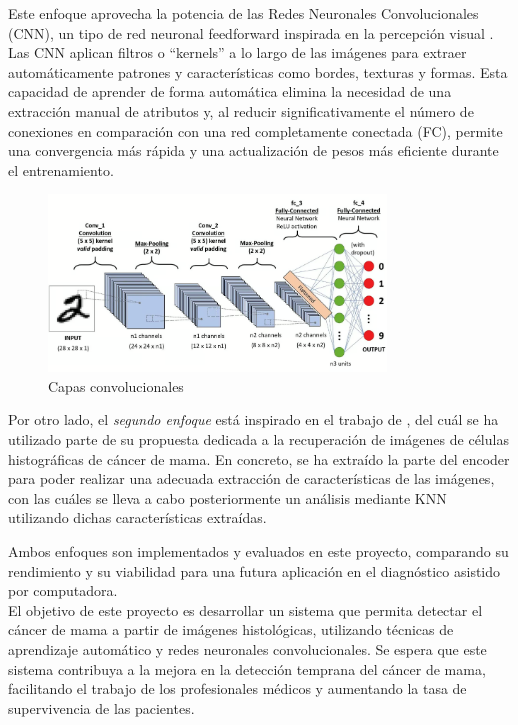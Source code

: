 \documentclass[12pt]{article} %
\begin{document}
Este enfoque aprovecha la potencia de las Redes Neuronales Convolucionales (CNN), un tipo de red neuronal feedforward inspirada en la percepción visual \cite{hubel1962receptive}. Las CNN aplican filtros o “kernels” a lo largo de las imágenes para extraer automáticamente patrones y características como bordes, texturas y formas. Esta capacidad de aprender de forma automática elimina la necesidad de una extracción manual de atributos y, al reducir significativamente el número de conexiones en comparación con una red completamente conectada (FC), permite una convergencia más rápida y una actualización de pesos más eficiente durante el entrenamiento.\\

\begin{figure}[!ht]
    \centering
    \includegraphics[width=0.8\textwidth]{CNN.png}
    \caption{Capas convolucionales \cite{datacamp_cnn}}
    \label{fig:capas_convolucionales}
\end{figure}

Por otro lado, el \textit{segundo enfoque} está inspirado en el trabajo de \cite{bardou2018classification}, del cuál se ha utilizado parte de su propuesta dedicada a la recuperación de imágenes de células histográficas de cáncer de mama. En concreto, se ha extraído la parte del encoder para poder realizar una adecuada extracción de características de las imágenes, con las cuáles se lleva a cabo posteriormente un análisis mediante KNN utilizando dichas características extraídas.

\newpage
Ambos enfoques son implementados y evaluados en este proyecto, comparando su rendimiento y su viabilidad para una futura aplicación en el diagnóstico asistido por computadora.\\

El objetivo de este proyecto es desarrollar un sistema que permita detectar el cáncer de mama a partir de imágenes histológicas, utilizando técnicas de aprendizaje automático y redes neuronales convolucionales. Se espera que este sistema contribuya a la mejora en la detección temprana del cáncer de mama, facilitando el trabajo de los profesionales médicos y aumentando la tasa de supervivencia de las pacientes.
\end{document}
